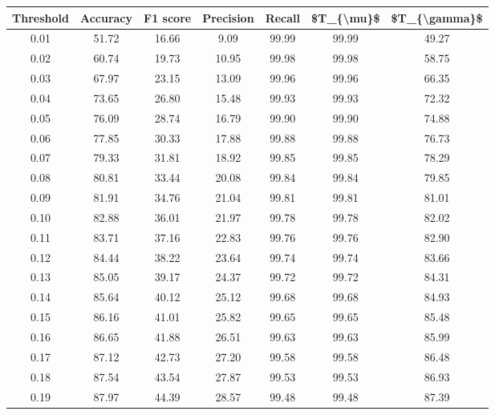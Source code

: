 \begin{tabular}{|c|c|c|c|c|c|c|}
\toprule
 Threshold &  Accuracy &  F1 score &  Precision &  Recall &  \$T\_\{\textbackslash mu\}\$ &  \$T\_\{\textbackslash gamma\}\$ \\
\hline
      0.01 &     51.72 &     16.66 &       9.09 &   99.99 &      99.99 &         49.27 \\
      0.02 &     60.74 &     19.73 &      10.95 &   99.98 &      99.98 &         58.75 \\
      0.03 &     67.97 &     23.15 &      13.09 &   99.96 &      99.96 &         66.35 \\
      0.04 &     73.65 &     26.80 &      15.48 &   99.93 &      99.93 &         72.32 \\
      0.05 &     76.09 &     28.74 &      16.79 &   99.90 &      99.90 &         74.88 \\
      0.06 &     77.85 &     30.33 &      17.88 &   99.88 &      99.88 &         76.73 \\
      0.07 &     79.33 &     31.81 &      18.92 &   99.85 &      99.85 &         78.29 \\
      0.08 &     80.81 &     33.44 &      20.08 &   99.84 &      99.84 &         79.85 \\
      0.09 &     81.91 &     34.76 &      21.04 &   99.81 &      99.81 &         81.01 \\
      0.10 &     82.88 &     36.01 &      21.97 &   99.78 &      99.78 &         82.02 \\
      0.11 &     83.71 &     37.16 &      22.83 &   99.76 &      99.76 &         82.90 \\
      0.12 &     84.44 &     38.22 &      23.64 &   99.74 &      99.74 &         83.66 \\
      0.13 &     85.05 &     39.17 &      24.37 &   99.72 &      99.72 &         84.31 \\
      0.14 &     85.64 &     40.12 &      25.12 &   99.68 &      99.68 &         84.93 \\
      0.15 &     86.16 &     41.01 &      25.82 &   99.65 &      99.65 &         85.48 \\
      0.16 &     86.65 &     41.88 &      26.51 &   99.63 &      99.63 &         85.99 \\
      0.17 &     87.12 &     42.73 &      27.20 &   99.58 &      99.58 &         86.48 \\
      0.18 &     87.54 &     43.54 &      27.87 &   99.53 &      99.53 &         86.93 \\
      0.19 &     87.97 &     44.39 &      28.57 &   99.48 &      99.48 &         87.39 \\

\end{tabular}
